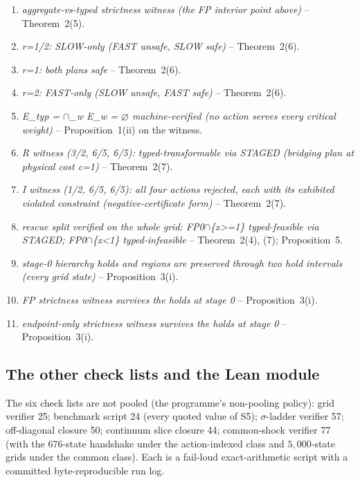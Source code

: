 \begin{enumerate}[leftmargin=2em,itemsep=1pt]
\item \emph{aggregate-vs-typed strictness witness (the FP interior point above)} -- Theorem~2(5).
\item \emph{r=1/2: SLOW-only (FAST unsafe, SLOW safe)} -- Theorem~2(6).
\item \emph{r=1: both plans safe} -- Theorem~2(6).
\item \emph{r=2: FAST-only (SLOW unsafe, FAST safe)} -- Theorem~2(6).
\item \emph{E\_typ = $\cap$\_w E\_w = $\varnothing$ machine-verified (no action serves every critical weight)} -- Proposition~1(ii) on the witness.
\item \emph{R witness (3/2, 6/5, 6/5): typed-transformable via STAGED (bridging plan at physical cost c=1)} -- Theorem~2(7).
\item \emph{I witness (1/2, 6/5, 6/5): all four actions rejected, each with its exhibited violated constraint (negative-certificate form)} -- Theorem~2(7).
\item \emph{rescue split verified on the whole grid: FP0$\cap$\{x>=1\} typed-feasible via STAGED; FP0$\cap$\{x<1\} typed-infeasible} -- Theorem~2(4), (7); Proposition~5.
\item \emph{stage-0 hierarchy holds and regions are preserved through two hold intervals (every grid state)} -- Proposition~3(i).
\item \emph{FP strictness witness survives the holds at stage 0} -- Proposition~3(i).
\item \emph{endpoint-only strictness witness survives the holds at stage 0} -- Proposition~3(i).
\end{enumerate}

\subsection{The other check lists and the Lean module}

The six check lists are not pooled (the programme's non-pooling policy): grid verifier 25; benchmark script 24 (every quoted value of S5); $\sigma$-ladder verifier 57; off-diagonal closure 50; continuum slice closure 44; common-shock verifier 77 (with the 676-state handshake under the action-indexed class and $5{,}000$-state grids under the common class). Each is a fail-loud exact-arithmetic script with a committed byte-reproducible run log.

